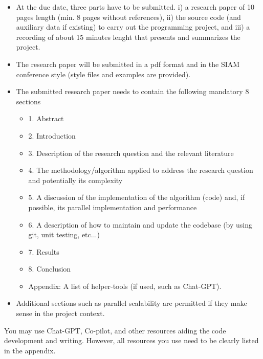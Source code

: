 \documentclass[12pt]{article} %
\begin{document}
\begin{itemize}
 \item At the due date, three parts have to be submitted. i) a research paper of 10 pages length (min. 8 pages without references), ii) the source code (and auxiliary data if existing) to carry out the programming project, and iii) a recording of about 15 minutes lenght that presents and summarizes the project.
 \item The research paper will be submitted in a pdf format and in the SIAM conference style (style files and examples are provided).
 \item The submitted research paper needs to contain the following mandatory 8 sections
 \begin{itemize}
  \item 1. Abstract
  \item 2. Introduction
  \item 3. Description of the research question and the relevant literature
  \item 4. The methodology/algorithm applied to address the research question 
  and potentially its complexity
 \item 5. A discussion of the implementation of the algorithm (code) and, if possible, its parallel implementation and performance
 \item 6. A description of how to maintain and update the codebase (by using git, unit testing, etc...) 
 \item 7. Results
 \item 8. Conclusion
  \item Appendix: A list of helper-tools (if used, such as Chat-GPT).
 \end{itemize}


 \item Additional sections such as parallel scalability are permitted if they make sense in the project context.
\end{itemize}


You may use Chat-GPT, Co-pilot, and other resources aiding the code development and writing. However, all resources you use need to be clearly listed in the appendix.








% 
\end{document}

